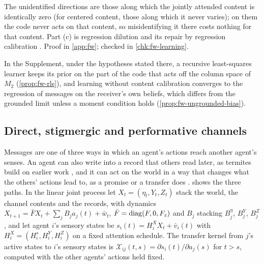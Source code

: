 The unidentified directions are those along which the jointly attended content is identically zero (for centered content, those along which it never varies); on them the code never acts on that content, so misidentifying it there costs nothing for that content. Part (c) is regression dilution and its repair by regression calibration \citep{carroll2006measurement}. Proof in \cref{app:fw}; checked in \cref{chk:fw-learning}.

In the Supplement, under the hypotheses stated there, a recursive least-squares learner keeps its prior on the part of the code that acts off the column space of $M_2$ (\cref{prop:fw-rls}), and learning without content calibration converges to the regression of messages on the receiver's own beliefs, which differs from the grounded limit unless a moment condition holds (\cref{prop:fw-ungrounded-bias}).

\subsection{Direct, stigmergic and performative channels}\label{sec:fw-channels}

Messages are one of three ways in which an agent's actions reach another agent's senses. An agent can also write into a record that others read later, as termites build on earlier work \citep{grasse1959reconstruction,theraulaz1999brief,heylighen2016stigmergy}, and it can act on the world in a way that changes what the others' actions lead to, as a promise or a transfer does \citep{austin1962how}.  shows the three paths. In the linear joint process let $X_t=(\eta_t,Y_t,Z_t)$ stack the world, the channel contents and the records, with dynamics $X_{t+1}=\bar FX_t+\sum_jB_ja_j(t)+\bar w_t$, $\bar F=\operatorname{diag}(F,0,F_z)$ and $B_j$ stacking $B^\eta_j$, $B^Y_j$, $B^Z_j$, and let agent $i$'s sensory states be $s_i(t)=H^X_iX_t+\bar v_i(t)$ with $H^X_i=(H^s_i,H^Y_i,H^Z_i)$ on a fixed attention schedule. The transfer kernel from $j$'s active states to $i$'s sensory states is $\mathcal X_{ij}(t,s)=\partial s_i(t)/\partial a_j(s)$ for $t>s$, computed with the other agents' actions held fixed.

